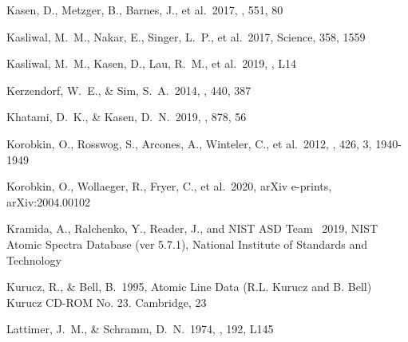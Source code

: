 \documentclass[twocolumn]{aastex63}
\begin{document}
\begin{thebibliography}{}
 Kasen, D., Metzger, B., Barnes, J., et al.\ 2017, \nat, 551, 80


 Kasliwal, M.~M., Nakar, E., Singer, L.~P., et al.\ 2017, Science, 358, 1559

 Kasliwal, M.~M., Kasen, D., Lau, R.~M., et al.\ 2019, \mnras, L14



 Kerzendorf, W.~E., \& Sim, S.~A.\ 2014, \mnras, 440, 387

 Khatami, D.~K., \& Kasen, D.~N.\ 2019, \apj, 878, 56

 Korobkin, O., Rosswog, S., Arcones, A., Winteler, C., et al.\ 2012, \mnras, 426, 3, 1940-1949

 Korobkin, O., Wollaeger, R., Fryer, C., et al.\ 2020, arXiv e-prints, arXiv:2004.00102


 Kramida, A., Ralchenko, Y., Reader, J., and {NIST ASD Team} \ 2019, NIST Atomic Spectra Database (ver 5.7.1), National Institute of Standards and Technology

 Kurucz, R., \& Bell, B.\ 1995, Atomic Line Data (R.L. Kurucz and B. Bell) Kurucz CD-ROM No. 23. Cambridge, 23





 Lattimer, J.~M., \& Schramm, D.~N.\ 1974, \apjl, 192, L145


\end{thebibliography}
\end{document}
